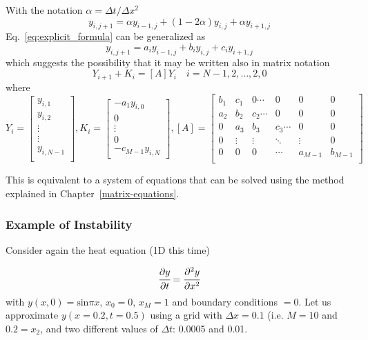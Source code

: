 With the notation $\alpha = \Delta t/\Delta x^2$
\begin{equation}
y_{i,j+1} = \alpha y_{i−1,j} + (1 − 2\alpha)y_{i,j} + \alpha y_{i+1,j} 
\label{eq:explicit_formula}
\end{equation}
Eq.~\ref{eq:explicit_formula} can be generalized as
\begin{equation}
y_{i,j+1} = a_i y_{i−1,j} + b_i y_{i,j} + c_i y_{i+1,j} 
\label{eq:explicit_formula}
\end{equation}
\noindent
which suggests the possibility that it may be written also in matrix notation
\begin{equation}
Y_{i+1} + K_i = [A]Y_i \quad i=N-1, 2,\ldots,2,0
\end{equation}
\noindent
where
\begin{equation*}
Y_i =
\begin{bmatrix}
y_{i, 1}\\
y_{i, 2}\\
\vdots\\
\vdots\\
y_{i,N-1}\\
\end{bmatrix},
K_i=
\begin{bmatrix}
-a_1 y_{i,0}\\
0\\
\vdots\\
0\\
-c_{M-1}y_{i,N}
\end{bmatrix},
[A] = 
\begin{bmatrix}
b_1 & c_1 & 0 \cdots & 0 & 0 & 0 \\
a_2 & b_2 & c_2 \cdots & 0 & 0 & 0\\
0  & a_3 & b_3 & c_3\cdots & 0 & 0 \\
0  & \vdots & \vdots & \ddots & \vdots & 0 \\
0 & 0 & 0 & \cdots & a_{M-1} & b_{M-1} \\
\end{bmatrix}
\end{equation*}

This is equivalent to a system of equations that can be solved using the method explained in Chapter~\ref{matrix-equations}.

\subsubsection{Example of Instability}
Consider again the heat equation (1D this time)

\begin{equation}
\cfrac{\partial y}{\partial t} = \cfrac{\partial^2 y}{\partial x^2}
\end{equation}
\noindent
with $y(x, 0) = \textrm{sin}\pi x$, $x_{0} = 0$, $x_M = 1$ and boundary conditions $= 0$. Let us approximate $y(x = 0.2, t = 0.5)$ using a grid with $\Delta x = 0.1$ (i.e. $M = 10$ and $0.2 = x_2$, and two different values of $\Delta t$: 0.0005 and 0.01.

